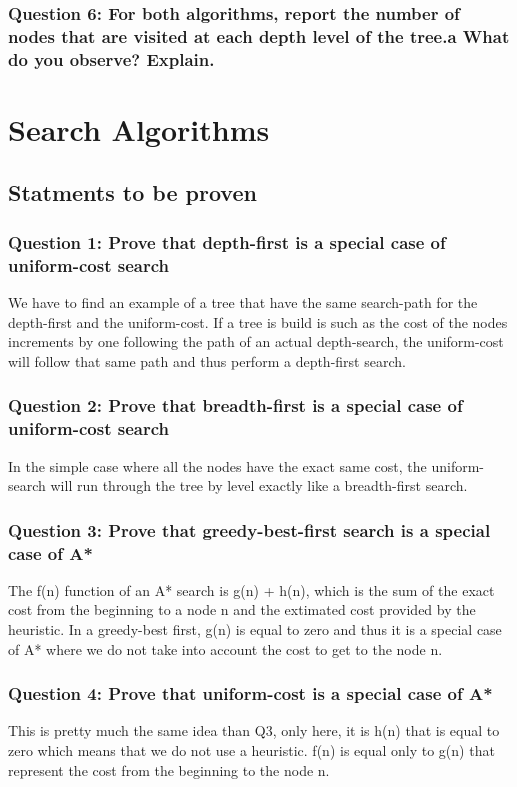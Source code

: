\documentclass[a4paper,10pt]{article}
\begin{document}
			\subsubsection{Question 6: For both algorithms, report the number of nodes that are visited at each depth
level of the tree.a What do you observe? Explain.}
	
	\section{Search Algorithms}
		\subsection{Statments to be proven}
			\subsubsection{Question 1: Prove that depth-first is a special case of uniform-cost search}
				We have to find an example of a tree that have the same search-path for the depth-first and the uniform-cost. If a tree is build is such as the cost of the nodes increments by one following the path of an actual depth-search, the uniform-cost will follow that same path and thus perform a depth-first search. 
				
			\subsubsection{Question 2: Prove that breadth-first is a special case of uniform-cost search}	
				In the simple case where all the nodes have the exact same cost, the uniform-search will run through the tree by level exactly like a breadth-first search.
			\subsubsection{Question 3: Prove that greedy-best-first search is a special case of A*}
				The f(n) function of an A* search is g(n) + h(n), which is the sum of the exact cost from the beginning to a node n and the extimated cost provided by the heuristic. In a greedy-best first, g(n) is equal to zero and thus it is a special case of A* where we do not take into account the cost to get to the node n. 
			\subsubsection{Question 4: Prove that uniform-cost is a special case of A*}
				This is pretty much the same idea than Q3, only here, it is h(n) that is equal to zero which means that we do not use a heuristic. f(n) is equal only to g(n) that represent the cost from the beginning to the node n.\\
			
\end{document}
